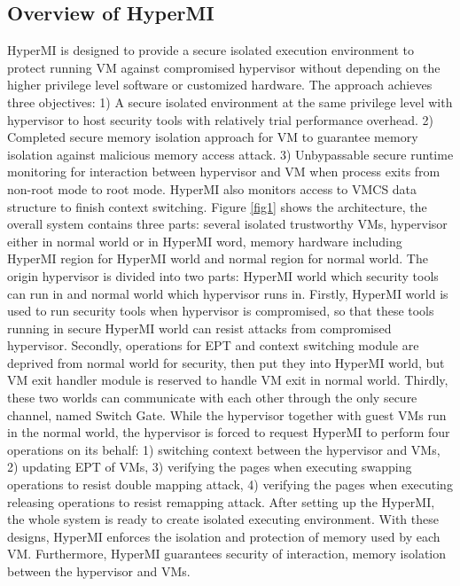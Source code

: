\documentclass[conference]{IEEEtran}
\begin{document}
\subsection{Overview of HyperMI} 
HyperMI is designed to provide a secure isolated execution environment to protect running VM against compromised hypervisor without depending on the higher privilege level software or customized hardware.
The approach achieves three objectives: 1) A secure isolated environment at the same privilege level with hypervisor to host security tools with relatively trial performance overhead. 2) Completed secure memory isolation approach for VM to guarantee memory isolation against malicious memory access attack. 3) Unbypassable secure runtime monitoring for interaction between hypervisor and VM when process exits from non-root mode to root mode. HyperMI also monitors access to VMCS data structure to finish context switching.
Figure \ref{fig1} shows the architecture, the overall system contains three parts: several isolated trustworthy VMs, hypervisor either in normal world or in HyperMI word, memory hardware including HyperMI region for HyperMI world and normal region for normal world.
The origin hypervisor is divided into two parts: HyperMI world which security tools can run in and normal world which hypervisor runs in. Firstly, HyperMI world is used to run security tools when hypervisor is compromised, so that these tools running in secure HyperMI world can resist attacks from compromised hypervisor. Secondly, operations for EPT and context switching module are deprived from normal world for security, then put they into HyperMI world, but VM exit handler module is reserved to handle VM exit in normal world. Thirdly, these two worlds can communicate with each other through the only secure channel, named Switch Gate. 
While the hypervisor together with guest VMs run in the normal world, the hypervisor is forced to request HyperMI to perform four operations on its behalf: 1) switching context between the hypervisor and VMs, 2) updating EPT of VMs, 3) verifying the pages when executing swapping operations to resist double mapping attack, 4) verifying the pages when executing releasing operations to resist remapping attack. After setting up the HyperMI, the whole system is ready to create isolated executing environment. With these designs, HyperMI enforces the isolation and protection of memory used by each VM. Furthermore, HyperMI guarantees security of interaction, memory isolation between the hypervisor and VMs.
\end{document}
